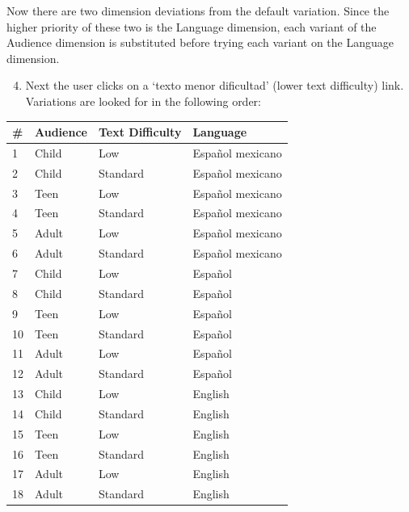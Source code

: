 \documentclass[letterpaper,10pt,english]{sphinxmanual}
\begin{document}
Now there are two dimension deviations from the default variation. Since the higher priority of these two is the Language dimension, each variant of the Audience dimension is substituted before trying each variant on the Language dimension.
\begin{enumerate}
\setcounter{enumi}{3}
\item {} 
Next the user clicks on a `texto menor dificultad' (lower text difficulty) link. Variations are looked for in the following order:

\end{enumerate}

\begin{tabulary}{\linewidth}{|L|L|L|L|}
\hline
\textbf{
\#
} & \textbf{
Audience
} & \textbf{
Text Difficulty
} & \textbf{
Language
}\\
\hline

1
 & 
Child
 & 
Low
 & 
Español mexicano
\\

2
 & 
Child
 & 
Standard
 & 
Español mexicano
\\

3
 & 
Teen
 & 
Low
 & 
Español mexicano
\\

4
 & 
Teen
 & 
Standard
 & 
Español mexicano
\\

5
 & 
Adult
 & 
Low
 & 
Español mexicano
\\

6
 & 
Adult
 & 
Standard
 & 
Español mexicano
\\

7
 & 
Child
 & 
Low
 & 
Español
\\

8
 & 
Child
 & 
Standard
 & 
Español
\\

9
 & 
Teen
 & 
Low
 & 
Español
\\

10
 & 
Teen
 & 
Standard
 & 
Español
\\

11
 & 
Adult
 & 
Low
 & 
Español
\\

12
 & 
Adult
 & 
Standard
 & 
Español
\\

13
 & 
Child
 & 
Low
 & 
English
\\

14
 & 
Child
 & 
Standard
 & 
English
\\

15
 & 
Teen
 & 
Low
 & 
English
\\

16
 & 
Teen
 & 
Standard
 & 
English
\\

17
 & 
Adult
 & 
Low
 & 
English
\\

18
 & 
Adult
 & 
Standard
 & 
English
\\
\hline
\end{tabulary}
\end{document}
